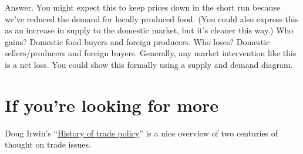 \begin{enumerate}
Answer.  You might expect this to keep prices down in the short run
because we've reduced the demand for locally produced food.
(You could also express this as an increase in supply to the domestic market, but it's cleaner this way.)
Who gains?  Domestic food buyers and foreign producers.
Who loses?  Domestic sellers/producers and foreign buyers.
Generally, any market intervention like this is a net loss.
You could show this formally using a supply and demand diagram.

\end{enumerate}


\section*{If you're looking for more}

Doug Irwin's
``\href{http://www.econlib.org/library/Columns/Irwintrade.html}
{History of trade policy}'' is a nice overview of two centuries of thought on trade issues.



%
%
%





